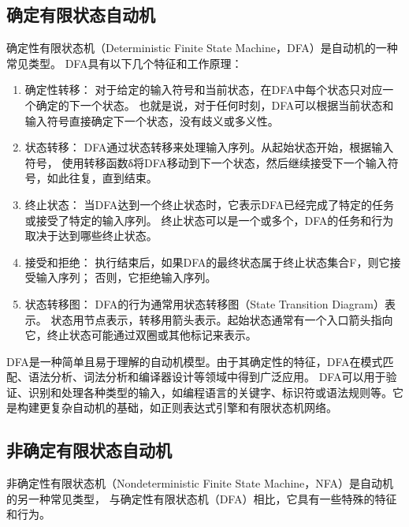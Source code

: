 \subsection{确定有限状态自动机}
确定性有限状态机（Deterministic Finite State Machine，DFA）是自动机的一种常见类型。
DFA具有以下几个特征和工作原理：
\begin{enumerate}
	\item 确定性转移： 对于给定的输入符号和当前状态，在DFA中每个状态只对应一个确定的下一个状态。
 也就是说，对于任何时刻，DFA可以根据当前状态和输入符号直接确定下一个状态，没有歧义或多义性。
	\item 状态转移： DFA通过状态转移来处理输入序列。从起始状态开始，根据输入符号，
 使用转移函数δ将DFA移动到下一个状态，然后继续接受下一个输入符号，如此往复，直到结束。
	\item 终止状态： 当DFA达到一个终止状态时，它表示DFA已经完成了特定的任务或接受了特定的输入序列。
 终止状态可以是一个或多个，DFA的任务和行为取决于达到哪些终止状态。
	\item 接受和拒绝： 执行结束后，如果DFA的最终状态属于终止状态集合F，则它接受输入序列；
 否则，它拒绝输入序列。
	\item 状态转移图： DFA的行为通常用状态转移图（State Transition Diagram）表示。
 状态用节点表示，转移用箭头表示。起始状态通常有一个入口箭头指向它，终止状态可能通过双圈或其他标记来表示。
\end{enumerate}
DFA是一种简单且易于理解的自动机模型。由于其确定性的特征，DFA在模式匹配、语法分析、词法分析和编译器设计等领域中得到广泛应用。
DFA可以用于验证、识别和处理各种类型的输入，如编程语言的关键字、标识符或语法规则等。它是构建更复杂自动机的基础，如正则表达式引擎和有限状态机网络。
\subsection{非确定有限状态自动机}
非确定性有限状态机（Nondeterministic Finite State Machine，NFA）是自动机的另一种常见类型，
与确定性有限状态机（DFA）相比，它具有一些特殊的特征和行为。

